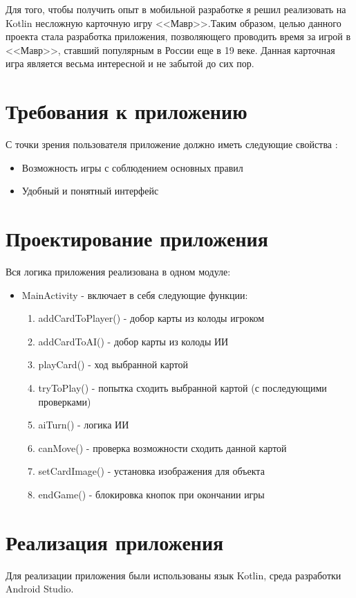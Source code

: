 \documentclass[a4paper,12pt]{article}
\begin{document}
Для того, чтобы получить опыт в мобильной разработке я решил реализовать на Kotlin несложную карточную игру <<Мавр>>.Таким образом, целью данного проекта стала разработка приложения, позволяющего проводить время за игрой в <<Мавр>>, ставший популярным в России еще в 19 веке. Данная карточная игра является весьма интересной и не забытой до сих пор.
\newpage
\section{Требования к приложению}
С точки зрения пользователя приложение должно иметь следующие свойства :
\begin{itemize}
    \item Возможность игры с соблюдением основных правил
    \item Удобный и понятный интерфейс
\end{itemize}

\newpage
\section{Проектирование приложения}

Вся логика приложения реализована в одном модуле:
\begin{itemize}
    \item MainActivity - включает в себя следующие функции:
    \begin{enumerate}
        \item addCardToPlayer() - добор карты из колоды игроком
        \item addCardToAI() - добор карты из колоды ИИ
        \item playCard() - ход выбранной картой
        \item tryToPlay() - попытка сходить выбранной картой (с последующими проверками)
        \item aiTurn() - логика ИИ
        \item canMove() - проверка возможности сходить данной картой
        \item setCardImage() - установка изображения для объекта
        \item endGame() - блокировка кнопок при окончании игры
    \end{enumerate}
\end{itemize}

\newpage
\section{Реализация приложения}
Для реализации приложения были использованы язык Kotlin, среда разработки Android Studio.
\end{document}
